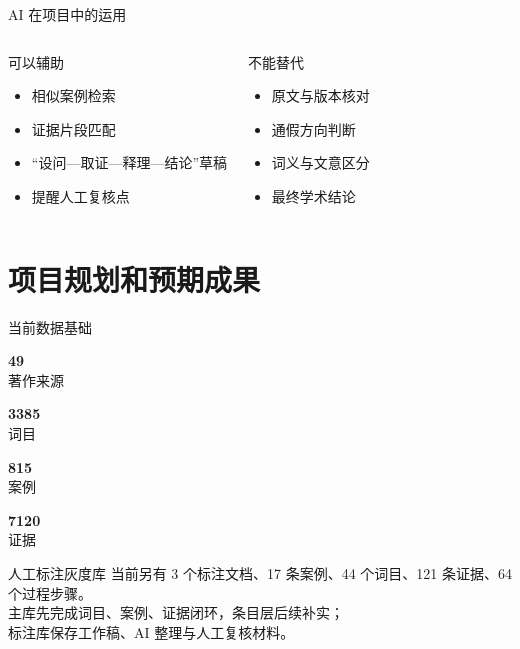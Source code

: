 \documentclass[aspectratio=169]{beamer}
\newcommand{\numstat}[2]{%
  \begin{minipage}{0.22\linewidth}
    \centering
    {\Huge\textcolor{rucRed}{\textbf{#1}}}\\[-1mm]
    {\small #2}
  \end{minipage}
}
\begin{document}
\begin{frame}{AI 在项目中的运用}
    \begin{columns}[T]
        \begin{block}{可以辅助}
            \begin{itemize}
                \item 相似案例检索
                \item 证据片段匹配
                \item “设问—取证—释理—结论”草稿
                \item 提醒人工复核点
            \end{itemize}
        \end{block}
        \begin{block}{不能替代}
            \begin{itemize}
                \item 原文与版本核对
                \item 通假方向判断
                \item 词义与文意区分
                \item 最终学术结论
            \end{itemize}
        \end{block}
    \end{columns}
\end{frame}

\section{项目规划和预期成果}

\begin{frame}{当前数据基础}
    \vspace{0.25cm}
    \begin{center}
        \numstat{49}{著作来源}
        \numstat{3385}{词目}
        \numstat{815}{案例}
        \numstat{7120}{证据}
    \end{center}
    \vspace{0.6cm}
    \begin{block}{人工标注灰度库}
        当前另有 3 个标注文档、17 条案例、44 个词目、121 条证据、64 个过程步骤。\\
        主库先完成词目、案例、证据闭环，条目层后续补实；\\
        标注库保存工作稿、AI 整理与人工复核材料。
    \end{block}
\end{frame}
\end{document}
